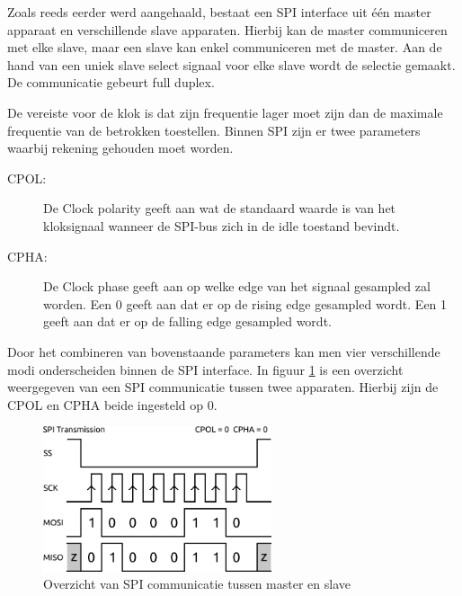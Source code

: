 			\par Zoals reeds eerder werd aangehaald, bestaat een SPI interface uit \'e\'en master apparaat en verschillende slave apparaten. Hierbij kan de master communiceren met elke slave, maar een slave kan enkel communiceren met de master. Aan de hand van een uniek slave select signaal voor elke slave wordt de selectie gemaakt. De communicatie gebeurt full duplex. 

			\par De vereiste voor de klok is dat zijn frequentie lager moet zijn dan de maximale frequentie van de betrokken toestellen. Binnen SPI zijn er twee parameters waarbij rekening gehouden moet worden.


				\begin{description}

					\item[CPOL:] De Clock polarity geeft aan wat de standaard waarde is van het kloksignaal wanneer de SPI-bus zich in de idle toestand bevindt. 

					\item[CPHA:] De Clock phase geeft aan op welke edge van het signaal gesampled zal worden. Een 0 geeft aan dat er op de rising edge gesampled wordt. Een 1 geeft aan dat er op de falling edge gesampled wordt.

				\end{description}

			\par Door het combineren van bovenstaande parameters kan men vier verschillende modi onderscheiden binnen de SPI interface. In figuur \ref{spi_clock} is een overzicht weergegeven van een SPI communicatie tussen twee apparaten. Hierbij zijn de CPOL en CPHA beide ingesteld op 0.

				\begin{figure}[H]					  
					  \centering
					  \includegraphics[width=0.6\textwidth]{Vooronderzoek/spi.png}
					  \caption{Overzicht van SPI communicatie tussen master en slave}
					  \label{spi_clock}
				\end{figure}

